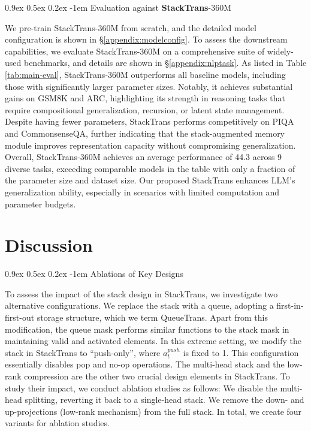 \documentclass{article}
\makeatletter
\providecommand{\paragraph}{}
\renewcommand{\paragraph}[1]{%
  \@startsection{paragraph}{4}{\z@}%
                {0.9ex \@plus 0.5ex \@minus 0.2ex}%
                {-1em}%
                {\normalsize\bfseries}%
  {#1}
}
\DeclareRobustCommand{\method}{{\sc StackTrans}\xspace}
\DeclareRobustCommand{\textbfmethod}{{\sc \textbf{StackTrans}}\xspace}
\makeatother
\begin{document}
\paragraph{Evaluation against \textbfmethod-360M}
We pre-train \method-360M from scratch, and the detailed model configuration is shown in \S\ref{appendix:modelconfig}. 
To assess the downstream capabilities, we evaluate \method-360M on a comprehensive suite of widely-used benchmarks, and details are shown in \S\ref{appendix:nlptask}.
As listed in Table \ref{tab:main-eval}, \method-360M outperforms all baseline models, including those with significantly larger parameter sizes.
Notably, it achieves substantial gains on GSM8K and ARC, highlighting its strength in reasoning tasks that require compositional generalization, recursion, or latent state management.
Despite having fewer parameters, \method performs competitively on PIQA and CommonsenseQA, further indicating that the stack-augmented memory module improves representation capacity without compromising generalization.
Overall, \method-360M achieves an average performance of 44.3 across 9 diverse tasks, exceeding comparable models in the table with only a fraction of the parameter size and dataset size.
Our proposed \method enhances LLM's generalization ability, especially in scenarios with limited computation and parameter budgets.



\section{Discussion}
\label{sec:analysis}

\paragraph{Ablations of Key Designs} 
To assess the impact of the stack design in \method, we investigate two alternative configurations.
 We replace the stack with a queue, adopting a first-in-first-out storage structure, which we term QueueTrans.
Apart from this modification, the queue mask performs similar functions to the stack mask in maintaining valid and activated elements.
 In this extreme setting, we modify the stack in \method to ``push-only'', where $a_t^{push}$ is fixed to 1.
This configuration essentially disables pop and no-op operations.
The multi-head stack and the low-rank compression are the other two crucial design elements in \method.
To study their impact, we conduct ablation studies as follows:
 We disable the multi-head splitting, reverting it back to a single-head stack.
 We remove the down- and up-projections (low-rank mechanism) from the full stack.
In total, we create four variants for ablation studies.
\end{document}

